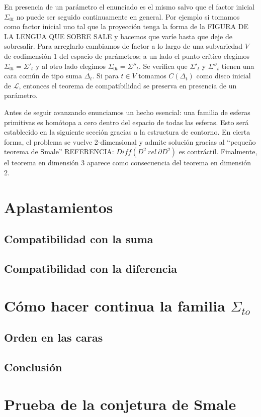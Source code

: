 \documentclass[twoside, 11pt]{article}
\begin{document}
En presencia de un parámetro el enunciado es el mismo salvo que el factor inicial $\Sigma_{0t}$ no puede ser seguido continuamente en general. Por ejemplo si tomamos como factor inicial uno tal que la proyección tenga la forma de la FIGURA DE LA LENGUA QUE SOBRE SALE y hacemos que varíe hasta que deje de sobresalir. Para arreglarlo cambiamos de factor a lo largo de una subvariedad $V$ de codimensión 1 del espacio de parámetros; a un lado el punto crítico elegimos $\Sigma_{0t}=\Sigma'_t$ y al otro lado elegimos $\Sigma_{0t}=\Sigma''_t$. Se verifica que $\Sigma'_t$ y $\Sigma''_t$ tienen una cara común de tipo suma $\Delta_t$. Si para $t\in V$ tomamos $C(\Delta_t)$ como disco inicial de $\mathcal{L}$, entonces el teorema de compatibilidad se preserva en presencia de un parámetro. 

Antes de seguir avanzando enunciamos un hecho esencial: una familia de esferas primitivas es homótopa a cero dentro del espacio de todas las esferas. Esto será establecido en la siguiente sección gracias a la estructura de contorno. En cierta forma, el problema se vuelve 2-dimensional y admite solución gracias al ``pequeño teorema de Smale'' REFERENCIA: $Diff(D^2\ rel\ \partial D^2)$ es contráctil. Finalmente, el teorema en dimensión 3 aparece como consecuencia del teorema en dimensión 2.

\section{Aplastamientos}

\subsection{Compatibilidad con la suma}
\subsection{Compatibilidad con la diferencia}

\section{Cómo hacer continua la familia $\Sigma_{to}$}
\subsection{Orden en las caras}
\subsection{Conclusión}


\section{Prueba de la conjetura de Smale}
\end{document}
